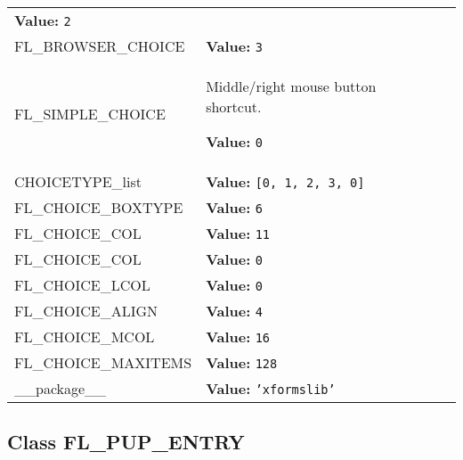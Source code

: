 \begin{longtable}{|p{\varnamewidth}|p{\vardescrwidth}|l}
\textbf{Value:} 
{\tt 2}&\\
\cline{1-2}
\raggedright F\-L\-\_\-B\-R\-O\-W\-S\-E\-R\-\_\-C\-H\-O\-I\-C\-E\- & \raggedright \textbf{Value:} 
{\tt 3}&\\
\cline{1-2}
\raggedright F\-L\-\_\-S\-I\-M\-P\-L\-E\-\_\-C\-H\-O\-I\-C\-E\- & \raggedright Middle/right mouse button shortcut.

\textbf{Value:} 
{\tt 0}&\\
\cline{1-2}
\raggedright C\-H\-O\-I\-C\-E\-T\-Y\-P\-E\-\_\-l\-i\-s\-t\- & \raggedright \textbf{Value:} 
{\tt \texttt{[}0\texttt{, }1\texttt{, }2\texttt{, }3\texttt{, }0\texttt{]}}&\\
\cline{1-2}
\raggedright F\-L\-\_\-C\-H\-O\-I\-C\-E\-\_\-B\-O\-X\-T\-Y\-P\-E\- & \raggedright \textbf{Value:} 
{\tt 6}&\\
\cline{1-2}
\raggedright F\-L\-\_\-C\-H\-O\-I\-C\-E\-\_\-C\-O\-L\-1\- & \raggedright \textbf{Value:} 
{\tt 11}&\\
\cline{1-2}
\raggedright F\-L\-\_\-C\-H\-O\-I\-C\-E\-\_\-C\-O\-L\-2\- & \raggedright \textbf{Value:} 
{\tt 0}&\\
\cline{1-2}
\raggedright F\-L\-\_\-C\-H\-O\-I\-C\-E\-\_\-L\-C\-O\-L\- & \raggedright \textbf{Value:} 
{\tt 0}&\\
\cline{1-2}
\raggedright F\-L\-\_\-C\-H\-O\-I\-C\-E\-\_\-A\-L\-I\-G\-N\- & \raggedright \textbf{Value:} 
{\tt 4}&\\
\cline{1-2}
\raggedright F\-L\-\_\-C\-H\-O\-I\-C\-E\-\_\-M\-C\-O\-L\- & \raggedright \textbf{Value:} 
{\tt 16}&\\
\cline{1-2}
\raggedright F\-L\-\_\-C\-H\-O\-I\-C\-E\-\_\-M\-A\-X\-I\-T\-E\-M\-S\- & \raggedright \textbf{Value:} 
{\tt 128}&\\
\cline{1-2}
\raggedright \_\-\_\-p\-a\-c\-k\-a\-g\-e\-\_\-\_\- & \raggedright \textbf{Value:} 
{\tt \texttt{'}\texttt{xformslib}\texttt{'}}&\\
\cline{1-2}
\end{longtable}



\subsection{Class FL\_PUP\_ENTRY}

